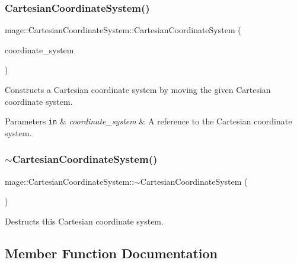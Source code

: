 \subsubsection{\texorpdfstring{Cartesian\+Coordinate\+System()}{CartesianCoordinateSystem()}\hspace{0.1cm}{\footnotesize\ttfamily [4/4]}}
{\footnotesize\ttfamily mage\+::\+Cartesian\+Coordinate\+System\+::\+Cartesian\+Coordinate\+System (\begin{DoxyParamCaption}\item[{\hyperlink{structmage_1_1_cartesian_coordinate_system}{Cartesian\+Coordinate\+System} \&\&}]{coordinate\+\_\+system }\end{DoxyParamCaption})\hspace{0.3cm}{\ttfamily [default]}}

Constructs a Cartesian coordinate system by moving the given Cartesian coordinate system.


\begin{DoxyParams}[1]{Parameters}
\mbox{\tt in}  & {\em coordinate\+\_\+system} & A reference to the Cartesian coordinate system. \\
\hline
\end{DoxyParams}
\hypertarget{structmage_1_1_cartesian_coordinate_system_a86effcef63e455323c194063c0f1fd46}{}\label{structmage_1_1_cartesian_coordinate_system_a86effcef63e455323c194063c0f1fd46} 
\subsubsection{\texorpdfstring{$\sim$\+Cartesian\+Coordinate\+System()}{~CartesianCoordinateSystem()}}
{\footnotesize\ttfamily mage\+::\+Cartesian\+Coordinate\+System\+::$\sim$\+Cartesian\+Coordinate\+System (\begin{DoxyParamCaption}{ }\end{DoxyParamCaption})\hspace{0.3cm}{\ttfamily [default]}}

Destructs this Cartesian coordinate system. 

\subsection{Member Function Documentation}
\hypertarget{structmage_1_1_cartesian_coordinate_system_ae329f2a0d4d3a4c96d745d3af10fcaad}{}\label{structmage_1_1_cartesian_coordinate_system_ae329f2a0d4d3a4c96d745d3af10fcaad} 
